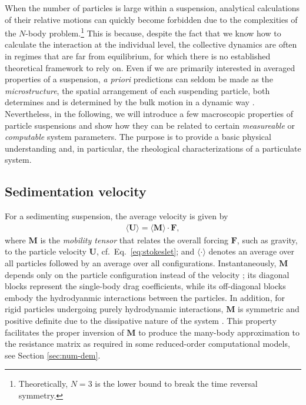 When the number of particles is large within a suspension, analytical calculations of their relative motions can quickly become forbidden due to the complexities of the $N$-body problem.\footnote{Theoretically, $N = 3$ is the lower bound to break the time reversal symmetry.}
This is because, despite the fact that we know how to calculate the interaction at the individual level, the collective dynamics are often in regimes that are far from equilibrium, for which there is no established theoretical framework to rely on.
Even if we are primarily interested in averaged properties of a suspension, \emph{a priori} predictions can seldom be made as the \emph{microstructure}, \ie the spatial arrangement of each suspending particle, both determines and is determined by the bulk motion in a dynamic way \citep{Brady_Bossis1988}.
Nevertheless, in the following, we will introduce a few macroscopic properties of particle suspensions and show how they can be related to certain \emph{measureable} or \emph{computable} system parameters. The purpose is to provide a basic physical understanding and, in particular, the rheological characterizations of a particulate system.

\subsection{Sedimentation velocity}

For a sedimenting suspension, the average velocity is given by
\begin{equation}
 \begin{aligned}
   \langle {\bm U} \rangle = \langle {\bm M} \rangle \cdot {\bm F},
 \end{aligned}
\end{equation}
where ${\bm M}$ is the \emph{mobility tensor} that relates the overall forcing ${\bm F}$, such as gravity, to the particle velocity ${\bm U}$, cf.\ Eq.\ \eqref{eq:stokeslet}; and $\langle \cdot \rangle$ denotes an average over all particles followed by an average over all configurations. Instantaneously, ${\bm M}$ depends only on the particle configuration instead of the velocity \citep{durlofsky_brady_bossis_1987}; its diagonal blocks represent the single-body drag coefficients, while its off-diagonal blocks embody the hydrodyanmic interactions between the particles. In addition, for rigid particles undergoing purely hydrodynamic interactions, ${\bm M}$ is symmetric and positive definite due to the dissipative nature of the system \citep{graham_2018}. This property facilitates the proper inversion of ${\bm M}$ to produce the many-body approximation to the resistance matrix as required in some reduced-order computational models, see Section \ref{sec:num-dem}.

